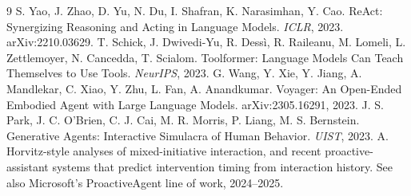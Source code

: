\documentclass[10pt,a4paper]{article}
\begin{document}
\begin{thebibliography}{9}
 S. Yao, J. Zhao, D. Yu, N. Du, I. Shafran, K. Narasimhan, Y. Cao. ReAct: Synergizing Reasoning and Acting in Language Models. \emph{ICLR}, 2023. arXiv:2210.03629.
 T. Schick, J. Dwivedi-Yu, R. Dess\`i, R. Raileanu, M. Lomeli, L. Zettlemoyer, N. Cancedda, T. Scialom. Toolformer: Language Models Can Teach Themselves to Use Tools. \emph{NeurIPS}, 2023.
 G. Wang, Y. Xie, Y. Jiang, A. Mandlekar, C. Xiao, Y. Zhu, L. Fan, A. Anandkumar. Voyager: An Open-Ended Embodied Agent with Large Language Models. arXiv:2305.16291, 2023.
 J. S. Park, J. C. O'Brien, C. J. Cai, M. R. Morris, P. Liang, M. S. Bernstein. Generative Agents: Interactive Simulacra of Human Behavior. \emph{UIST}, 2023.
 A. Horvitz-style analyses of mixed-initiative interaction, and recent proactive-assistant systems that predict intervention timing from interaction history. See also Microsoft's ProactiveAgent line of work, 2024--2025.
\end{thebibliography}
\end{document}
